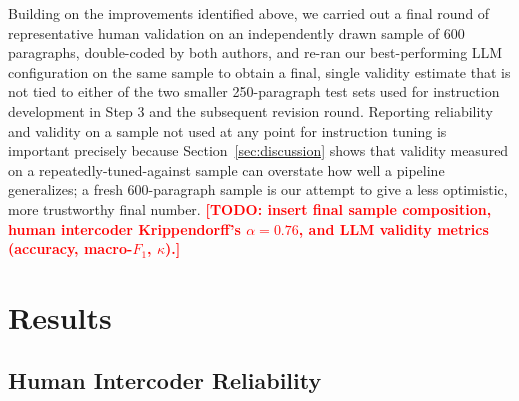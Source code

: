 \documentclass[a4paper,oneside,bibliography=totoc]{scrartcl}
\newcommand{\todo}[1]{\textcolor{red}{\textbf{[TODO: #1]}}}
\begin{document}
Building on the improvements identified above, we carried out a final round of representative human validation on an independently drawn sample of 600 paragraphs, double-coded by both authors, and re-ran our best-performing LLM configuration on the same sample to obtain a final, single validity estimate that is not tied to either of the two smaller 250-paragraph test sets used for instruction development in Step 3 and the subsequent revision round. Reporting reliability and validity on a sample not used at any point for instruction tuning is important precisely because Section~\ref{sec:discussion} shows that validity measured on a repeatedly-tuned-against sample can overstate how well a pipeline generalizes; a fresh 600-paragraph sample is our attempt to give a less optimistic, more trustworthy final number. \todo{insert final sample composition, human intercoder Krippendorff's $\alpha = 0.76$, and LLM validity metrics (accuracy, macro-$F_1$, $\kappa$).}

\section{Results}
\label{sec:results}

\subsection{Human Intercoder Reliability}
\label{sec:results-reliability}
\end{document}
